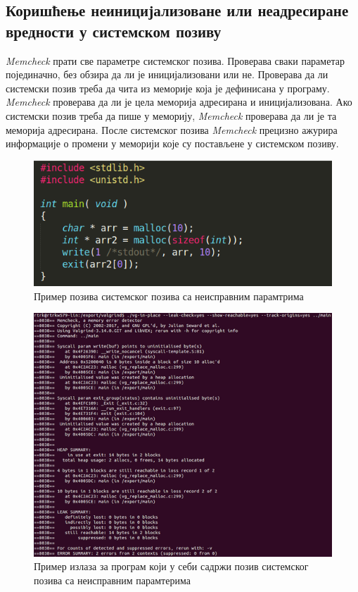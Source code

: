 \documentclass[12pt,oneside]{memoir}
\begin{document}
\subsection{Коришћење неиницијализоване или неадресиране вредности у системском позиву}

\indent \textit{Memcheck} прати све параметре системског позива.  Проверава сваки параметар појединачно, без обзира да ли је иницијализовани или не. Проверава да ли системски позив треба да чита из меморије која је дефинисана у програму. \textit{Memcheck} проверава да ли је цела меморија адресирана и иницијализована. Ако системски позив треба да пише у меморију, \textit{Memcheck} проверава да ли је та меморија адресирана. После системског позива \textit{Memcheck} прецизно ажурира информације о промени у меморији које су постављене у системском позиву.

\begin{figure}[h!]
\begin{center}
\includegraphics[scale=0.75]{slika3.png}
\end{center}
\caption{Пример позива системског позива са неисправним парамтрима}
\label{fig:main1}
\end{figure}



\begin{figure}[h!]
\begin{center}
\includegraphics[scale=0.75]{slika4.png}
\end{center}
\caption{Пример излаза за програм који у себи садржи позив системског позива са неисправним парамтерима}
\label{fig:memcheck1}
\end{figure}
\end{document}
